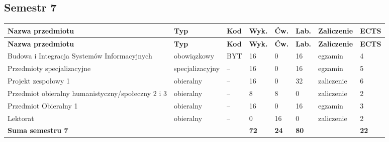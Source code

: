 \documentclass[12pt,a4paper]{article}
\newcommand{\thdrule}{\noalign{\global\setlength{\extrarowheight}{0pt}}}
\newcommand{\thdend}{\noalign{\global\setlength{\extrarowheight}{4pt}}}
\begin{document}
\clearpage
\subsection*{Semestr 7}

{\scriptsize
\begin{longtable}{m{5.0cm}m{1.9cm}m{0.75cm}m{0.85cm}m{0.85cm}m{0.85cm}m{1.45cm}m{0.9cm}}
\thdrule\toprule
\rowcolor{pjatkRed}
{\color{white}\footnotesize\textbf{\vphantom{Ag}Nazwa przedmiotu}} & {\color{white}\footnotesize\textbf{\vphantom{Ag}Typ}} & {\color{white}\footnotesize\textbf{\vphantom{Ag}Kod}} & {\color{white}\footnotesize\textbf{\vphantom{Ag}Wyk.}} & {\color{white}\footnotesize\textbf{\vphantom{Ag}Ćw.}} & {\color{white}\footnotesize\textbf{\vphantom{Ag}Lab.}} & {\color{white}\footnotesize\textbf{\vphantom{Ag}Zaliczenie}} & {\color{white}\footnotesize\textbf{\vphantom{Ag}ECTS}} \\
\midrule\thdend
\endfirsthead
\thdrule\toprule
\rowcolor{pjatkRed}
{\color{white}\footnotesize\textbf{\vphantom{Ag}Nazwa przedmiotu}} & {\color{white}\footnotesize\textbf{\vphantom{Ag}Typ}} & {\color{white}\footnotesize\textbf{\vphantom{Ag}Kod}} & {\color{white}\footnotesize\textbf{\vphantom{Ag}Wyk.}} & {\color{white}\footnotesize\textbf{\vphantom{Ag}Ćw.}} & {\color{white}\footnotesize\textbf{\vphantom{Ag}Lab.}} & {\color{white}\footnotesize\textbf{\vphantom{Ag}Zaliczenie}} & {\color{white}\footnotesize\textbf{\vphantom{Ag}ECTS}} \\
\midrule\thdend
\endhead
\rowcolor{tableRowLight} Budowa i Integracja Systemów Informacyjnych & {\scriptsize obowiązkowy} & BYT & 16 & 0 & 16 & {\scriptsize egzamin} & 4 \\
\rowcolor{tableElective} Przedmioty specjalizacyjne & {\scriptsize specjalizacyjny} & -- & 16 & 0 & 16 & {\scriptsize egzamin} & 5 \\
\rowcolor{tableElective} Projekt zespołowy 1 & {\scriptsize obieralny} & -- & 16 & 0 & 32 & {\scriptsize zaliczenie} & 6 \\
\rowcolor{tableElective} Przedmiot obieralny humanistyczny/społeczny 2 i 3 & {\scriptsize obieralny} & -- & 8 & 8 & 0 & {\scriptsize zaliczenie} & 2 \\
\rowcolor{tableElective} Przedmiot Obieralny 1 & {\scriptsize obieralny} & -- & 16 & 0 & 16 & {\scriptsize egzamin} & 3 \\
\rowcolor{tableElective} Lektorat & {\scriptsize obieralny} & -- & 0 & 16 & 0 & {\scriptsize zaliczenie} & 2 \\
\midrule[\heavyrulewidth]
\rowcolor{tableSummary} \textbf{Suma semestru 7} & & & \textbf{72} & \textbf{24} & \textbf{80} & & \textbf{22} \\
\bottomrule
\end{longtable}}
\end{document}
